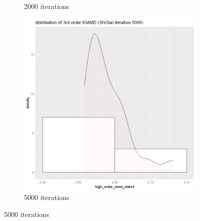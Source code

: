 \documentclass{article}
\begin{document}
\begin{figure}[h!]
\begin{subfigure}[b]{0.3\textwidth}
         \caption{2000 iterations}
     \end{subfigure}
     \hfill
     \begin{subfigure}[b]{0.3\textwidth}
         \centering
         \includegraphics[width=\textwidth]{kmmd_figures/sngan_face_highdist_5000.png}
         \caption{5000 iterations}
     \end{subfigure}
\end{figure}
\end{document}

